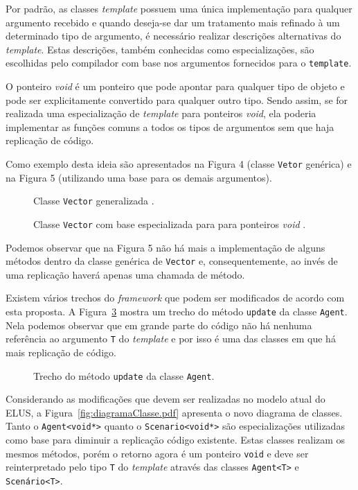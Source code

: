 \documentclass[12pt]{article}
\newcommand{\fig}[4][h]{
  \begin{figure}[#1] {\centering{\texttt{[image: fig/\#2]}}\par}
    \caption{#3\label{fig:#2}}
  \end{figure}
}
\newcommand{\prg}[3][ht!]{
  \begin{figure}[#1]
      
    \caption{#3\label{prg:#2}}
  \end{figure}
}
\begin{document}
Por padrão, as classes \textit{template} possuem uma única implementação para qualquer argumento recebido e quando deseja-se dar um tratamento mais refinado à um determinado tipo de argumento, é necessário realizar descrições alternativas do \textit{template}. Estas descrições, também conhecidas como especializações, são escolhidas pelo compilador com base nos argumentos fornecidos para o \texttt{template}.

O ponteiro \textit{void} é um ponteiro que pode apontar para qualquer tipo de objeto e pode ser explicitamente convertido para qualquer outro tipo. Sendo assim, se for realizada uma especialização de \textit{template} para ponteiros \textit{void}, ela poderia implementar as funções comuns a todos os tipos de argumentos sem que haja replicação de código. 

Como exemplo desta ideia são apresentados na Figura
4 (classe \texttt{Vetor} genérica) e na Figura
5 (utilizando uma base para os demais argumentos).

\prg{vector}{Classe \texttt{Vector} generalizada \cite{cpp97Stroustrup}.}
\prg{vector_void}{Classe \texttt{Vector} com base especializada para para ponteiros \textit{void} \cite{cpp97Stroustrup}.}


Podemos observar que na Figura 5
não há mais a implementação de alguns métodos dentro da classe genérica de \texttt{Vector} e, consequentemente, ao invés de uma replicação haverá apenas uma chamada de método.

Existem vários trechos do \textit{framework} que podem ser modificados de acordo com esta proposta. A Figura~\ref{fig:algoritmo_update_agent.png} mostra um trecho do método \texttt{update} da classe \texttt{Agent}. Nela podemos observar que em grande parte do código não há nenhuma referência ao argumento \texttt{T} do \textit{template} e por isso é uma das classes em que há mais replicação de código.

\fig{algoritmo_update_agent.png}{Trecho do m\'{e}todo \texttt{update} da classe \texttt{Agent}.}{scale=.27}

Considerando as modificações que devem ser realizadas no modelo atual do ELUS, a Figura~\ref{fig:diagramaClasse.pdf} apresenta o novo diagrama de classes. Tanto o \texttt{Agent<void*>} quanto o \texttt{Scenario<void*>} são especializações utilizadas como base para diminuir a replicação código existente. Estas classes realizam os mesmos métodos, porém o retorno agora é um ponteiro \texttt{void} e deve ser reinterpretado pelo tipo \texttt{T} do \textit{template} através das classes \texttt{Agent<T>} e \texttt{Scenário<T>}.
\end{document}
